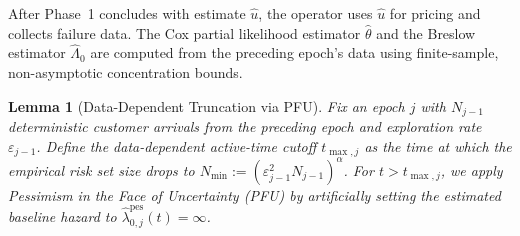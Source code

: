 \documentclass[letterpaper, 10 pt, conference]{IEEEconf}
\newtheorem{lemma}{Lemma}
\newcommand{\what}[1]{\widehat{#1}}
\begin{document}
After Phase~1 concludes with estimate $\what{u}$, the operator uses $\what{u}$ for pricing and collects failure data. The Cox partial likelihood estimator $\what{\theta}$ and the Breslow estimator $\what{\Lambda}_0$ are computed from the preceding epoch's data using finite-sample, non-asymptotic concentration bounds.

\begin{lemma}[Data-Dependent Truncation via PFU]
    \label{lem:breslow_tail}
    Fix an epoch $j$ with $N_{j-1}$ deterministic customer arrivals from the preceding epoch and exploration rate $\varepsilon_{j-1}$. Define the \emph{data-dependent active-time cutoff} $t_{\max,j}$ as the time at which the empirical risk set size drops to $N_{\min} := (\varepsilon_{j-1}^2 N_{j-1})^\alpha$. For $t > t_{\max,j}$, we apply \emph{Pessimism in the Face of Uncertainty (PFU)} by artificially setting the estimated baseline hazard to $\what{\lambda}_{0,j}^{\mathrm{pes}}(t) = \infty$.
\end{lemma}
\end{document}
